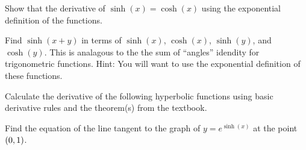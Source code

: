 \begin{questions}
\question Show that the derivative of \(\sinh(x)=\cosh(x)\) using the exponential definition of the functions.
\begin{solutionorbox}[2.5in]
\end{solutionorbox}

\question Find \(\sinh(x+y)\) in terms of \( \sinh(x) \), \( \cosh(x) \), \( \sinh(y) \), and \( \cosh(y) \). This is analagous to the the sum of ``angles'' idendity for trigonometric functions. Hint: You will want to use the exponential definition of these functions.
\begin{solutionorbox}[4.75in]
\end{solutionorbox}

\newpage

\question Calculate the derivative of the following hyperbolic functions using basic derivative rules and the theorem(s) from the textbook.
	\begin{multicols}{2}
	\end{multicols}

\question Find the equation of the line tangent to the graph of \( y=e^{\sinh(x)} \) at the point \(\left(0, 1\right)\).
\begin{solutionorbox}[2.5in]
\end{solutionorbox}

\end{questions}
